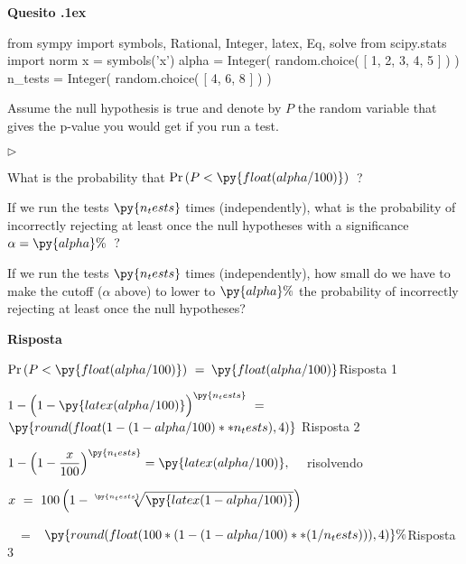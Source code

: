 \documentclass[11pt,twoside,a4paper]{article}
\newcommand{\mylabel}[1]{#1\hfill}
\renewenvironment{itemize}
  {\begin{list}{$\triangleright$}{%
   \setlength{\parskip}{0mm}
   \setlength{\topsep}{.4\baselineskip}
   \setlength{\rightmargin}{0mm}
   \setlength{\listparindent}{0mm}
   \setlength{\itemindent}{0mm}
   \setlength{\labelwidth}{2ex}
   \setlength{\itemsep}{.4\baselineskip}
   \setlength{\parsep}{0mm}
   \setlength{\partopsep}{0mm}
   \setlength{\labelsep}{1ex}
   \setlength{\leftmargin}{\labelwidth+\labelsep}
   \let\makelabel\mylabel}}{%
   \end{list}\vspace*{-1.3mm}}
\newcounter{quesito}
\newenvironment{question}{\addtocounter{quesito}{1}\par\textbf{Quesito \thequesito.\kern1ex}}{\vspace{0.5\parskip}}
\newenvironment{answer}{\par\textbf{Risposta\quad}}{\vspace{\parskip}}
\begin{document}
  
  
  \begin{question} %
  \begin{pycode}
  from sympy import symbols, Rational, Integer, latex, Eq, solve
  from scipy.stats import norm
  x = symbols('x')
  alpha = Integer( random.choice( [ 1, 2, 3, 4, 5 ] ) )
  n_tests = Integer( random.choice( [ 4, 6, 8 ] ) )
  \end{pycode}
  Assume the null hypothesis is true and denote by $P$ the random variable that gives the p-value you would get if you run a test.
  
  \begin{itemize}
  \item[1.] What is the probability that $\Pr(P<\py{float(alpha/100) })$~?
  
  \item[2.] If we run the tests $\py{n_tests}$ times (independently), what is the probability of incorrectly rejecting at least once the null hypotheses with a significance $\alpha=\py{alpha}\%$~?
  
  \item[3.] If we run the tests $\py{n_tests}$ times (independently), how small do we have to make the cutoff ($\alpha$ above) to lower to $\py{alpha}\%$ the probability of incorrectly rejecting at least once the null hypotheses? 
  \end{itemize}
  
  \begin{answer}
  
  $\Pr(P<\py{float(alpha/100) })\ =\ ${\color{blue}$\py{float(alpha/100) }$\hfill Risposta 1}
  
  
  $1-\Big(1-\py{latex(alpha/100) }\Big)^{\py{n_tests}}\ =\  ${\color{blue}$\py{round(float(1-(1-alpha/100)**n_tests), 4)}$ \hfill Risposta 2}
  
  $\displaystyle 1-\Big(1-\frac{x}{100}\Big)^{\py{n_tests}}=\py{latex(alpha/100) }, \quad$ 
  risolvendo 
  
  $\displaystyle x\ =\ 100\,\Big( 1-\sqrt[\py{n_tests}]{\py{latex(1-alpha/100) } }\Big)$\medskip
  
  $\displaystyle\phantom{x}\ =$ {\color{blue}$\kern1ex\py{round(float( 100*( 1- (1-alpha/100)**(1/n_tests) ) ), 4) }\%$\hfill Risposta 3}
  
  
  
  
  \end{answer}
  \end{question}
  
\end{document}
